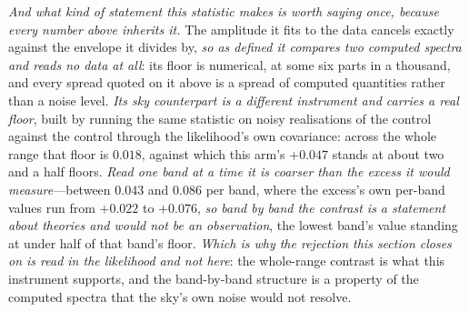 \documentclass[11pt,a4paper]{article}
\theoremstyle{plain}
\theoremstyle{definition}
\theoremstyle{remark}
\begin{document}
\emph{And what kind of statement this statistic makes is worth saying once, because every number above inherits
it.} The amplitude it fits to the data cancels exactly against the envelope it divides by, \emph{so as defined it
compares two computed spectra and reads no data at all}: its floor is numerical, at some six parts in a thousand,
and every spread quoted on it above is a spread of computed quantities rather than a noise level. \emph{Its sky
counterpart is a different instrument and carries a real floor}, built by running the same statistic on noisy
realisations of the control against the control through the likelihood's own covariance: across the whole range
that floor is $0.018$, against which this arm's $+0.047$ stands at about two and a half floors. \emph{Read one
band at a time it is coarser than the excess it would measure}---between $0.043$ and $0.086$ per band, where the
excess's own per-band values run from $+0.022$ to $+0.076$, \emph{so band by band the contrast is a statement
about theories and would not be an observation}, the lowest band's value standing at under half of that band's
floor. \emph{Which is why the rejection this section closes on is read in the likelihood and not here}: the
whole-range contrast is what this instrument supports, and the band-by-band structure is a property of the
computed spectra that the sky's own noise would not
resolve.
\end{document}
